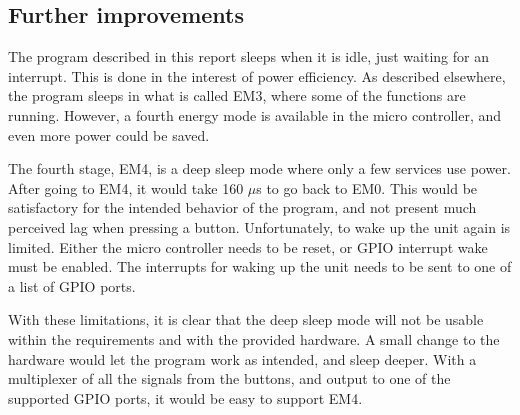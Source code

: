 \subsection{Further improvements}
The program described in this report sleeps when it is idle, just waiting for an interrupt.
This is done in the interest of power efficiency.
As described elsewhere, the program sleeps in what is called EM3, where some of the functions are running.
However, a fourth energy mode is available in the micro controller, and even more power could be saved.

The fourth stage, EM4, is a deep sleep mode where only a few services use power.
After going to EM4, it would take 160 $\mu$s to go back to EM0.
This would be satisfactory for the intended behavior of the program, and not present much perceived lag when pressing a button.
Unfortunately, to wake up the unit again is limited.
Either the micro controller needs to be reset, or GPIO interrupt wake must be enabled.
The interrupts for waking up the unit needs to be sent to one of a list of GPIO ports.\cite{referencemanual}

With these limitations, it is clear that the deep sleep mode will not be usable within the requirements and with the provided hardware.
A small change to the hardware would let the program work as intended, and sleep deeper.
With a multiplexer of all the signals from the buttons, and output to one of the supported GPIO ports, it would be easy to support EM4.
